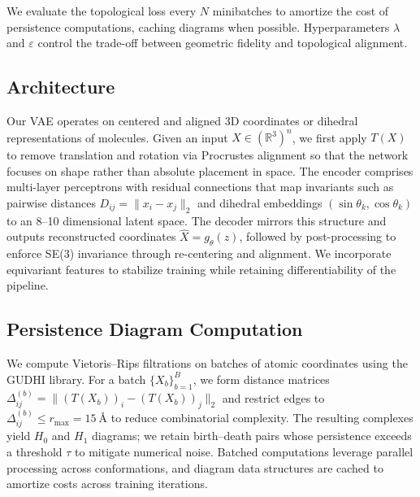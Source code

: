\documentclass[11pt]{article}
\begin{document}
We evaluate the topological loss every $N$ minibatches to amortize the cost of persistence computations, caching diagrams when possible. Hyperparameters $\lambda$ and $\varepsilon$ control the trade-off between geometric fidelity and topological alignment.

\subsection{Architecture}
Our VAE operates on centered and aligned 3D coordinates or dihedral representations of molecules. Given an input $X \in (\mathbb{R}^3)^n$, we first apply $T(X)$ to remove translation and rotation via Procrustes alignment so that the network focuses on shape rather than absolute placement in space. The encoder comprises multi-layer perceptrons with residual connections that map invariants such as pairwise distances $D_{ij} = \|x_i - x_j\|_2$ and dihedral embeddings $(\sin \theta_k, \cos \theta_k)$ to an 8--10 dimensional latent space. The decoder mirrors this structure and outputs reconstructed coordinates $\hat{X} = g_\theta(z)$, followed by post-processing to enforce SE(3) invariance through re-centering and alignment. We incorporate equivariant features to stabilize training while retaining differentiability of the pipeline.

\subsection{Persistence Diagram Computation}
We compute Vietoris--Rips filtrations on batches of atomic coordinates using the GUDHI library. For a batch $\{X_b\}_{b=1}^B$, we form distance matrices $\Delta^{(b)}_{ij} = \| (T(X_b))_i - (T(X_b))_j \|_2$ and restrict edges to $\Delta^{(b)}_{ij} \leq r_{\max} = 15~\text{\AA}$ to reduce combinatorial complexity. The resulting complexes yield $H_0$ and $H_1$ diagrams; we retain birth--death pairs whose persistence exceeds a threshold $\tau$ to mitigate numerical noise. Batched computations leverage parallel processing across conformations, and diagram data structures are cached to amortize costs across training iterations.
\end{document}
